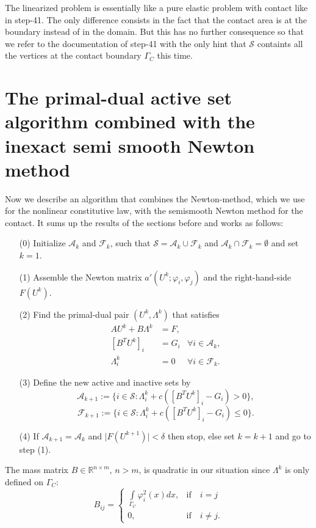 \documentclass{article}
\begin{document}
The linearized problem is essentially like a pure elastic problem with contact like
in step-41. The only difference consists in the fact that the contact area
is at the boundary instead of in the domain. But this has no further consequence
so that we refer to the documentation of step-41 with the only hint that
$\mathcal{S}$ containts all the vertices at the contact boundary $\Gamma_C$ this
time.

\section{The primal-dual active set algorithm combined with the inexact semi smooth
Newton method}

Now we describe an algorithm that combines the Newton-method, which we use for
the nonlinear constitutive law, with the semismooth Newton method for the contact. It
sums up the results of the sections before and works as follows:
\begin{itemize}
 \item[(0)] Initialize $\mathcal{A}_k$ and $\mathcal{F}_k$, such that $\mathcal{S} = \mathcal{A}_k \cup \mathcal{F}_k$ and $\mathcal{A}_k \cap \mathcal{F}_k = \emptyset$ and set $k = 1$.
 \item[(1)] Assemble the Newton matrix $a'(U^k;\varphi_i,\varphi_j)$ and the right-hand-side $F(U^k)$.
 \item[(2)] Find the primal-dual pair $(U^k,\Lambda^k)$ that satisfies
 \begin{align*}
 AU^k + B\Lambda^k & = F, &\\
 \left[B^TU^k\right]_i & = G_i & \forall i\in\mathcal{A}_k,\\
 \Lambda^k_i & = 0 & \forall i\in\mathcal{F}_k.
 \end{align*}
 \item[(3)] Define the new active and inactive sets by
 $$\mathcal{A}_{k+1}:=\lbrace i\in\mathcal{S}:\Lambda^k_i +
 c\left(\left[B^TU^k\right]_i - G_i\right) > 0\rbrace,$$
 $$\mathcal{F}_{k+1}:=\lbrace i\in\mathcal{S}:\Lambda^k_i +
 c\left(\left[B^TU^k\right]_i - G_i\right) \leq 0\rbrace.$$
 \item[(4)] If $\mathcal{A}_{k+1} = \mathcal{A}_k$ and $\vert
 F\left(U^{k+1}\right) \vert < \delta$ then stop, else set $k=k+1$ and go to
 step (1).
\end{itemize}
\noindent
The mass matrix $B\in\mathbb{R}^{n\times m}$, $n>m$, is quadratic in our
situation since $\Lambda^k$ is only defined on $\Gamma_C$:
$$B_{ij} = \begin{cases}
\int\limits_{\Gamma_C}\varphi_i^2(x)dx, & \text{if}\quad i=j\\
0, & \text{if}\quad i\neq j.
\end{cases}$$
\end{document}
